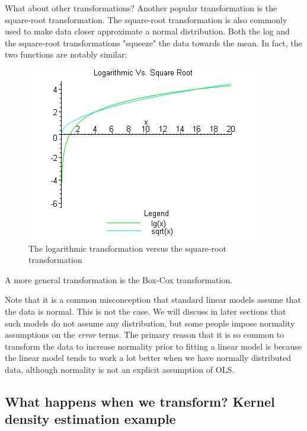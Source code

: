 What about other transformations? Another popular transformation is the square-root transformation. The square-root transformation is also commonly used to make data closer approximate a normal distribution. Both the log and the square-root transformations "squeeze" the data towards the mean. In fact, the two functions are notably similar:

\begin{figure}[H]
\begin{center}
\includegraphics[scale=0.7]{log_sqrt.png}
\end{center}
\caption{The logarithmic transformation versus the square-root transformation}
\label{fig:log_sqrt}
\end{figure}

A more general transformation is the Box-Cox transformation.



Note that it is a common misconception that standard linear models assume that the data is normal. This is not the case. We will discuss in later sections that such models do not assume any distribution, but some people impose normality assumptions on the \emph{error} terms. The primary reason that it is so common to transform the data to increase normality prior to fitting a linear model is because the linear model tends to work a lot better when we have normally distributed data, although normality is not an explicit assumption of OLS.





\subsection*{What happens when we transform? Kernel density estimation example}

